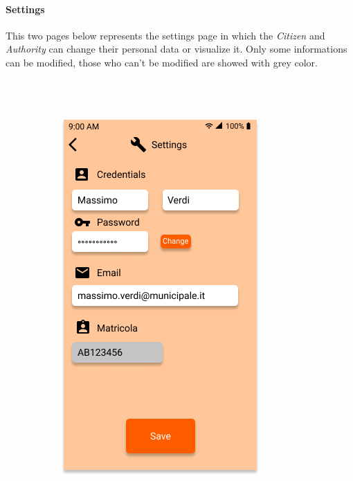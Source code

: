 \documentclass{article}
\begin{document}
\paragraph{Settings}
This two pages below represents the settings page in which the \textit{Citizen} and \textit{Authority} can change their 
personal data or visualize it. Only some informations can be modified, those who can't be modified are showed with 
grey color.
\\
\\
\\
\\
\begin{figure}[H]
    \begin{subfigure}{0.5\textwidth}
        \includegraphics[width=0.9\linewidth]{img/mockups/settings_authority.png} 

\end{subfigure}
\end{figure}
\end{document}
